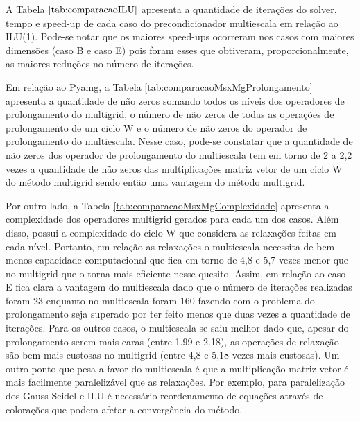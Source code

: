 A Tabela $\ref{tab:comparacaoILU}$ apresenta a quantidade de iterações do solver, tempo e speed-up de cada caso do precondicionador multiescala em relação ao ILU(1). Pode-se notar que os maiores speed-ups ocorreram nos casos com maiores dimensões (caso B e caso E) pois foram esses que obtiveram, proporcionalmente, as maiores reduções no número de iterações.

Em relação ao Pyamg, a Tabela \ref{tab:comparacaoMsxMgProlongamento} apresenta a quantidade de não zeros somando todos os níveis dos operadores de prolongamento do multigrid, o número de não zeros de todas as operações de prolongamento de um ciclo W e o número de não zeros do operador de prolongamento do multiescala. Nesse caso, pode-se constatar que a quantidade de não zeros dos operador de prolongamento do multiescala tem em torno de 2 a 2,2 vezes a quantidade de não zeros das multiplicações matriz vetor de um ciclo W do método multigrid sendo então uma vantagem do método multigrid.

Por outro lado, a Tabela \ref{tab:comparacaoMsxMgComplexidade} apresenta a complexidade dos operadores multigrid gerados para cada um dos casos. Além disso, possui a complexidade do ciclo W que considera as relaxações feitas em cada nível. Portanto, em relação as relaxações o multiescala necessita de bem menos capacidade computacional que fica em torno de 4,8 e 5,7 vezes menor que no multigrid que o torna mais eficiente nesse quesito. 
Assim, em relação ao caso E fica clara a vantagem do multiescala dado que o número de iterações realizadas foram 23 enquanto no multiescala foram 160 fazendo com o problema do prolongamento seja superado por ter feito menos que duas vezes a quantidade de iterações. Para os outros casos, o multiescala se saiu melhor dado que, apesar do prolongamento serem mais caras (entre 1.99 e 2.18), as operações de relaxação são bem mais custosas no multigrid (entre 4,8 e 5,18 vezes mais custosas). Um outro ponto que pesa a favor do multiescala é que a multiplicação matriz vetor é mais facilmente paralelizável que as relaxações. Por exemplo, para paralelização dos Gauss-Seidel e ILU é necessário reordenamento de equações através de colorações que podem afetar a convergência do método.


